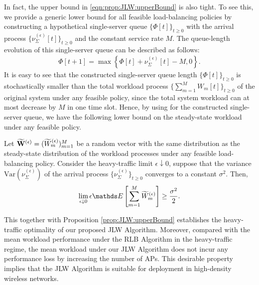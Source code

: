 \documentclass[10pt, conference, letterpaper]{IEEEtran} %
\begin{document}
In fact, the upper bound in \eqref{eqn:prop:JLW:upperBound} is also tight. To see this, we provide a generic lower bound for all feasible load-balancing policies by constructing a hypothetical single-server queue $\{\Phi[t]\}_{t\geq0}$ with the arrival process $\{\nu_{\Sigma}^{(\epsilon)}[t]\}_{t\geq0}$ and the constant service rate $M$. The queue-length evolution of this single-server queue can be described as follows: 
\begin{align}
\Phi[t+1]=\max\left\{\Phi[t]+\nu_{\Sigma}^{(\epsilon)}[t]-M,0\right\}.
\end{align}
It is easy to see that the constructed single-server queue length $\{\Phi[t]\}_{t\geq0}$ is stochastically smaller than the total workload process $\{\sum_{m=1}^{M}W_m[t]\}_{t\geq0}$ of the original system under any feasible policy, since the total system workload can at most decrease by $M$ in one time slot. Hence, by using \cite[Lemma 4]{erysri12} for the constructed single-server queue, we have the following lower bound on the steady-state workload under any feasible policy.

\begin{proposition}
\label{prop:LowerBound}
Let $\widetilde{\mathbf{W}}^{(\epsilon)}=(\widetilde{W}_m^{(\epsilon)})_{m=1}^{M}$ be a random vector with the same distribution as the steady-state distribution of the workload processes under any feasible load-balancing policy. Consider the heavy-traffic limit $\epsilon\downarrow0$, suppose that the variance $\text{Var}(\nu_{\Sigma}^{(\epsilon)})$ of the arrival process $\{\nu_{\Sigma}^{(\epsilon)}\}_{t\geq0}$ converges to a constant $\sigma^2$. Then,
\begin{align}
\lim_{\epsilon\downarrow0}\epsilon\bE\left[\sum_{m=1}^{M}\wt{W}_m^{(\epsilon)}\right]\geq\frac{\sigma^2}{2}.
\end{align}
\end{proposition}

This together with Proposition \ref{prop:JLW:upperBound} establishes the heavy-traffic optimality of our proposed JLW Algorithm. Moreover, compared with the mean workload performance under the RLB Algorithm in the heavy-traffic regime, the mean workload under our JLW Algorithm does not incur any performance loss by increasing the number of APs. This desirable property implies that the JLW Algorithm is suitable for deployment in high-density wireless networks.
\end{document}
